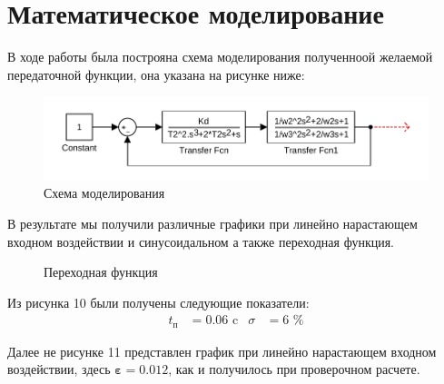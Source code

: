 \documentclass[russian, utf8]{eskdtext}
\begin{document}
\newpage
\section{Математическое моделирование}

В ходе работы была построяна схема моделирования полученноой желаемой передаточной функции, она указана на рисунке ниже: 
\begin{figure}[h!]
    \centering
    \includegraphics {images/model.pdf} 
    \caption{Схема моделирования}
\end{figure} \par

В результате мы получили различные графики при линейно нарастающем входном воздействии и синусоидальном а также переходная функция.
\begin{figure}[h!]
    \centering
    \caption{Переходная функция}
\end{figure} \par
Из рисунка 10 были получены следующие показатели:
\begin{align*}
    t_\text{п} & = 0.06\text{ c} & \sigma & = 6\text{ \%}
\end{align*} \par

\newpage
Далее не рисунке 11 представлен график при линейно нарастающем входном воздействии, здесь $\pmb{\varepsilon} = 0.012$, как и получилось при проверочном расчете.
\end{document}
